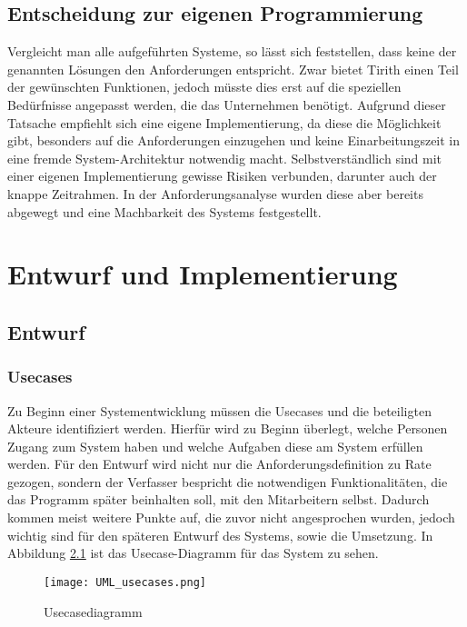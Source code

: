 \section{Entscheidung zur eigenen Programmierung}
\label{sec:decisionowncreating}

Vergleicht man alle aufgeführten Systeme, so lässt sich feststellen, dass keine der genannten Lösungen den Anforderungen entspricht.
Zwar bietet Tirith einen Teil der gewünschten Funktionen, jedoch müsste dies erst auf die speziellen Bedürfnisse angepasst werden, die das Unternehmen benötigt.
Aufgrund dieser Tatsache empfiehlt sich eine eigene Implementierung, da diese die Möglichkeit gibt, besonders auf die Anforderungen einzugehen und keine Einarbeitungszeit in eine fremde System-Architektur notwendig macht.
Selbstverständlich sind mit einer eigenen Implementierung gewisse Risiken verbunden, darunter auch der knappe Zeitrahmen.
In der Anforderungsanalyse wurden diese aber bereits abgewegt und eine Machbarkeit des Systems festgestellt.

\chapter{Entwurf und Implementierung}
\label{cha:entw_imp}

\section{Entwurf}
\label{sec:Entwurf}


\subsection{Usecases}
\label{subsec:usecases}

Zu Beginn einer Systementwicklung müssen die Usecases und die beteiligten Akteure identifiziert werden.
Hierfür wird zu Beginn überlegt, welche Personen Zugang zum System haben und welche Aufgaben diese am System erfüllen werden.
Für den Entwurf wird nicht nur die Anforderungsdefinition zu Rate gezogen, sondern der Verfasser bespricht die notwendigen Funktionalitäten, die das Programm später beinhalten soll, mit den Mitarbeitern selbst.
Dadurch kommen meist weitere Punkte auf, die zuvor nicht angesprochen wurden, jedoch wichtig sind für den späteren Entwurf des Systems, sowie die Umsetzung.
In Abbildung \ref{fig:UML_usecases} ist das Usecase-Diagramm für das System zu sehen.

\begin{figure}[H]
\centering
\texttt{[image: UML\_usecases.png]}
\caption{Usecasediagramm}
\label{fig:UML_usecases}
\end{figure}

